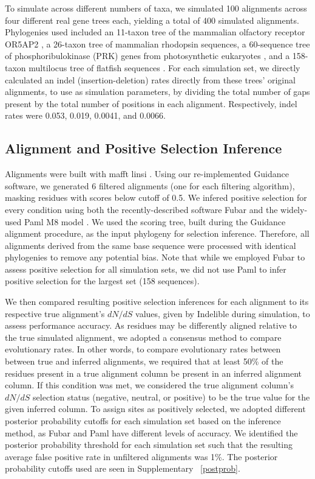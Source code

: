 \documentclass[10pt]{article}
\begin{document}
To simulate across different numbers of taxa, we simulated 100 alignments across four different real gene trees each, yielding a total of 400 simulated alignments. Phylogenies used included an 11-taxon tree of the mammalian olfactory receptor OR5AP2 \citep{Spielman2013}, a 26-taxon tree of mammalian rhodopsin sequences\citep{Spielman2013}, a 60-sequence tree of phosphoribulokinase (PRK) genes from photosynthetic eukaryotes \citep{Yang2011}, and a 158-taxon multilocus tree of flatfish sequences \citep{Betancur2013}.
For each simulation set, we directly calculated an indel (insertion-deletion) rates directly from these trees’ original alignments, to use as simulation parameters, by dividing the total number of gaps present by the total number of positions in each alignment. Respectively, indel rates were 0.053, 0.019, 0.0041, and 0.0066. 

\subsection*{Alignment and Positive Selection Inference}
Alignments were built with mafft linsi \citep{Katoh2002,Katoh2005}. Using our re-implemented Guidance software, we generated 6 filtered alignments (one for each filtering algorithm), masking residues with scores below cutoff of 0.5. We infered positive selection for every condition using both the recently-described software Fubar \citep{Murrell2013} and the widely-used Paml M8 model \citep{Yang2007}. We used the scoring tree, built during the Guidance alignment procedure, as the input phylogeny for selection inference. Therefore, all alignments derived from the same base sequence were processed with identical phylogenies to remove any potential bias. Note that while we employed Fubar to assess positive selection for all simulation sets, we did not use Paml to infer positive selection for the largest set (158 sequences).

We then compared resulting positive selection inferences for each alignment to its respective true alignment's $dN/dS$ values, given by Indelible during simulation, to assess performance accuracy. As residues may be differently aligned relative to the true simulated alignment, we adopted a consensus method to compare evolutionary rates. In other words, to compare evolutionary rates between between true and inferred alignments, we required that at least 50\% of the residues present in a true alignment column be present in an inferred alignment column. If this condition was met, we considered the true alignment column’s $dN/dS$  selection status (negative, neutral, or positive) to be the true value for the given inferred column. To assign sites as positively selected, we adopted different posterior probability cutoffs for each simulation set based on the inference method, as Fubar and Paml have different levels of accuracy. We identified the posterior probability threshold for each simulation set such that the resulting average false positive rate in unfiltered alignments was 1\%. The posterior probability cutoffs used are seen in Supplementary ~\ref{postprob}.
\end{document}
